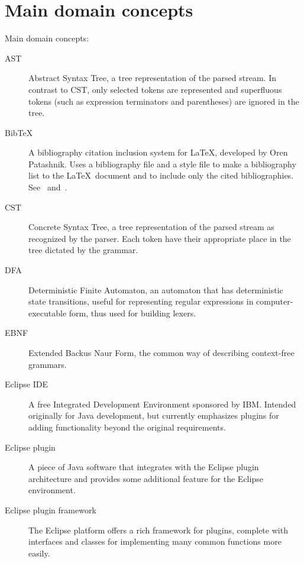 \documentclass[a4paper,11pt,twoside]{article}
\begin{document}
\section{Main domain concepts}
\label{sect:concepts}

Main domain concepts:

\begin{description}

\item[AST] Abstract Syntax Tree, a tree representation of the parsed
  stream. In contrast to CST, only selected tokens are represented and
  superfluous tokens (such as expression terminators and parentheses)
  are ignored in the tree.

\item[Bib\TeX] A bibliography citation inclusion system for \LaTeX ,
  developed by Oren Patashnik. Uses a bibliography file and a style file
  to make a bibliography list to the \LaTeX\ document and to include
  only the cited bibliographies. See~\cite{Lamport:LDP85} 
  and~\cite{Patashnik:Bib-TUG-03-1}.

\item[CST] Concrete Syntax Tree, a tree representation of the parsed
  stream as recognized by the parser. Each token have their appropriate
  place in the tree dictated by the grammar.

\item[DFA] Deterministic Finite Automaton, an automaton that has 
  deterministic state transitions, useful for representing regular 
  expressions in computer-executable form, thus used for building
  lexers.

\item[EBNF] Extended Backus Naur Form, the common way of describing
  context-free grammars.

\item[Eclipse IDE] A free Integrated Development Environment sponsored
  by IBM. Intended originally for Java development, but currently
  emphasizes plugins for adding functionality beyond the original
  requirements.
  
\item[Eclipse plugin] A piece of Java software that integrates with
  the Eclipse plugin architecture and provides some additional feature
  for the Eclipse environment.

\item[Eclipse plugin framework] The Eclipse platform offers a rich
  framework for plugins, complete with interfaces and classes for
  implementing many common functions more easily.


\end{description}
\end{document}
